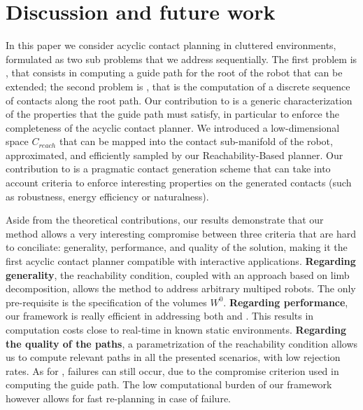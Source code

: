  \section{Discussion and future work} 
\label{sec:conclusion}

In this paper we consider acyclic contact planning in cluttered environments, formulated as two sub problems that we address sequentially.
The first problem is \Pa, that consists in computing a guide path for the root of the robot that can be extended; the second problem is \Pb, that is the computation of a discrete sequence of contacts along the root path.
Our contribution to \Pa is a generic characterization of the properties that the guide path must satisfy, in particular to enforce the completeness of the acyclic contact planner. We introduced a low-dimensional space $C_{reach}$ that can be mapped 
into the contact sub-manifold of the robot, approximated, and efficiently sampled by our Reachability-Based planner.
Our contribution to \Pb is a pragmatic contact generation scheme that can take into
account criteria to enforce interesting properties on the generated contacts (such as robustness, energy efficiency or naturalness).

Aside from the theoretical contributions, our results demonstrate that our method allows a very interesting compromise between three 
criteria that are hard to conciliate: generality, performance, and quality of the solution, making it the first acyclic contact
planner compatible with interactive applications.
%
\textbf{Regarding generality}, the reachability condition, coupled with an approach based on limb decomposition, 
allows the method to address arbitrary multiped robots. The only pre-requisite is the specification 
of the volumes $W^0$.
%
\textbf{Regarding performance}, our framework is really efficient in addressing both \Pa and \Pb. This results in computation costs close to real-time in
known static environments.
%
\textbf{Regarding the quality of the paths}, a parametrization of the reachability condition allows us to compute
relevant paths in all the presented scenarios, with low rejection rates.
As for \cite{Bouyarmane2009}, failures can still occur, due to the compromise criterion used in computing the guide path.
The low computational burden of our framework however allows for fast re-planning in case of failure.

